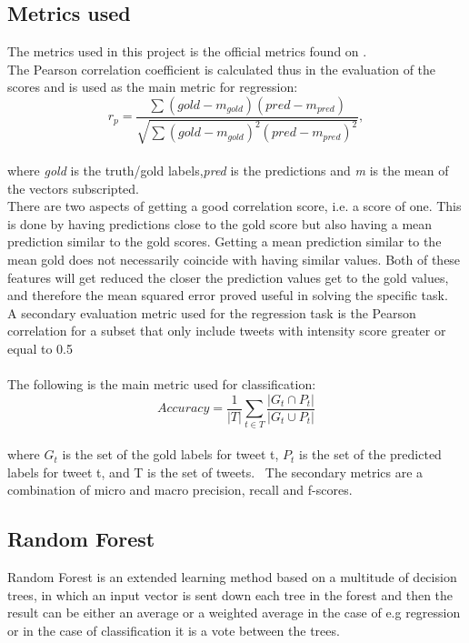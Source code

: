 \subsection{Metrics used}
The metrics used in this project is the official metrics found on \cite{codalab}. \\
The Pearson correlation coefficient is calculated thus in the evaluation of the scores and is used as the main metric for regression:\\
\begin{equation} \label{eq:pearson}
r_{p} = \dfrac{\sum \left(gold-m_{gold}\right) \left(pred-m_{pred}\right)}{\sqrt{\sum \left(gold-m_{gold}\right)^{2} \left(pred-m_{pred}\right)^{2}}},
\end{equation}\\
where \textit{gold} is the truth/gold labels,\textit{pred} is the predictions and \textit{m} is the mean of the vectors subscripted.\\
There are two aspects of getting a good correlation score, i.e. a score of one. This is done by having predictions close to the gold score but also having a mean prediction similar to the gold scores. Getting a mean prediction similar to the mean gold does not necessarily coincide with having similar values. Both of these features will get reduced the closer the prediction values get to the gold values, and therefore the mean squared error proved useful in solving the specific task.\\
A secondary evaluation metric used for the regression task is the Pearson correlation for a subset that only include tweets with intensity score greater or equal to 0.5 \\ \\
The following is the main metric used for classification:\\
\begin{equation} \label{eq:accuracy}
Accuracy = \dfrac{1}{\lvert T \rvert} \sum_{t\in T}\dfrac{\lvert G_{t} \cap P_{t}\rvert}{\lvert G_{t} \cup P_{t}\rvert}
\end{equation}\\
where $G_{t}$ is the set of the gold labels for tweet t, $P_{t}$ is the set of the predicted labels for tweet t, and T is the set of tweets. \
The secondary metrics are a combination of micro and macro precision, recall and f-scores.
\subsection{Random Forest}
Random Forest is an extended learning method based on a multitude of decision trees, in which an input vector is sent down each tree in the forest and then the result can be either an average or a weighted average in the case of e.g regression or in the case of classification it is a vote between the trees.